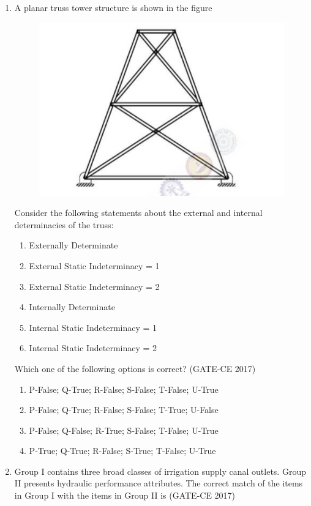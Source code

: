\documentclass[journal,12pt,onecolumn]{article}
\theoremstyle{remark}
\begin{document}
\begin{enumerate}
    \item A planar truss tower structure is shown in the figure 
    \begin{figure}[H]
    \centering
    \includegraphics[width=0.7\columnwidth]{imageq29.jpg}  
    \caption{}
    \label{fig:29}
    \end{figure} 
    Consider the following statements about the external and internal determinacies of the truss:
    \begin{enumerate}
        \item Externally Determinate
        \item External Static Indeterminacy = 1
        \item External Static Indeterminacy = 2
        \item Internally Determinate
        \item Internal Static Indeterminacy = 1
        \item Internal Static Indeterminacy = 2
    \end{enumerate}
    Which one of the following options is correct? \hfill (GATE-CE 2017)
    \begin{enumerate}
        \item P-False; Q-True; R-False; S-False; T-False; U-True
        \item P-False; Q-True; R-False; S-False; T-True; U-False
        \item P-False; Q-False; R-True; S-False; T-False; U-True
        \item P-True; Q-True; R-False; S-True; T-False; U-True
    \end{enumerate}

    \item Group I contains three broad classes of irrigation supply canal outlets. Group II presents hydraulic performance attributes. The correct match of the items in Group I with the items in Group II is \hfill (GATE-CE 2017)
    

\end{enumerate}
\end{document}
